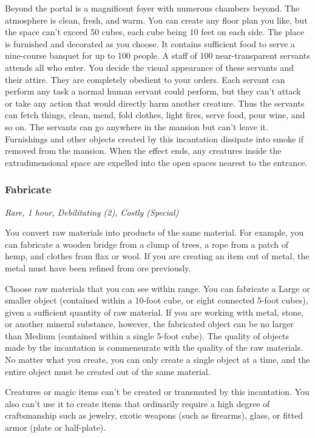 Beyond the portal is a magnificent foyer with numerous chambers beyond. The atmosphere is clean, fresh, and warm. You can create any floor plan you like, but the space can't exceed 50 cubes, each cube being 10 feet on each side. The place is furnished and decorated as you choose. It contains sufficient food to serve a nine-course banquet for up to 100 people. A staff of 100 near-transparent servants attends all who enter. You decide the visual appearance of these servants and their attire. They are completely obedient to your orders. Each servant can perform any task a normal human servant could perform, but they can't attack or take any action that would directly harm another creature. Thus the servants can fetch things, clean, mend, fold clothes, light fires, serve food, pour wine, and so on. The servants can go anywhere in the mansion but can't leave it. Furnishings and other objects created by this incantation dissipate into smoke if removed from the mansion. When the effect ends, any creatures inside the extradimensional space are expelled into the open spaces nearest to the entrance.

\subsubsection{Fabricate}
\textit{Rare, 1 hour, Debilitating (2), Costly (Special)}

You convert raw materials into products of the same material. For example, you can fabricate a wooden bridge from a clump of trees, a rope from a patch of hemp, and clothes from flax or wool. If you are creating an item out of metal, the metal must have been refined from ore previously.

Choose raw materials that you can see within range. You can fabricate a Large or smaller object (contained within a 10-foot cube, or eight connected 5-foot cubes), given a sufficient quantity of raw material. If you are working with metal, stone, or another mineral substance, however, the fabricated object can be no larger than Medium (contained within a single 5-foot cube). The quality of objects made by the incantation is commensurate with the quality of the raw materials. No matter what you create, you can only create a single object at a time, and the entire object must be created out of the same material.

Creatures or magic items can't be created or transmuted by this incantation. You also can't use it to create items that ordinarily require a high degree of craftsmanship such as jewelry, exotic weapons (such as firearms), glass, or fitted armor (plate or half-plate).

